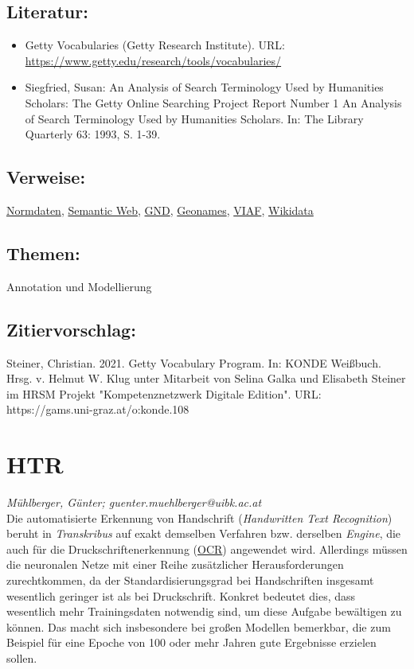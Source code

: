 \documentclass{article}
\begin{document}
        \subsection*{Literatur:}\begin{itemize}\item Getty Vocabularies (Getty Research Institute). URL: \url{https://www.getty.edu/research/tools/vocabularies/}\item Siegfried, Susan: An Analysis of Search Terminology Used by Humanities Scholars: The Getty Online Searching Project Report Number 1 An Analysis of Search Terminology Used by Humanities Scholars. In: The Library Quarterly 63: 1993, S. 1-39.\end{itemize}\subsection*{Verweise:}\href{https://gams.uni-graz.at/o:konde.147}{Normdaten}, \href{https://gams.uni-graz.at/o:konde.167}{Semantic Web}, \href{https://gams.uni-graz.at/o:konde.109}{GND}, \href{https://gams.uni-graz.at/o:konde.107}{Geonames}, \href{https://gams.uni-graz.at/o:konde.111}{VIAF}, \href{https://gams.uni-graz.at/o:konde.112}{Wikidata}\subsection*{Themen:}Annotation und Modellierung\subsection*{Zitiervorschlag:}Steiner, Christian. 2021. Getty Vocabulary Program. In: KONDE Weißbuch. Hrsg. v. Helmut W. Klug unter Mitarbeit von Selina Galka und Elisabeth Steiner im HRSM Projekt "Kompetenznetzwerk Digitale Edition". URL: https://gams.uni-graz.at/o:konde.108\newpage\section*{HTR} \emph{Mühlberger, Günter; guenter.muehlberger@uibk.ac.at }\\
        
    Die automatisierte Erkennung von Handschrift (\emph{Handwritten Text
                     Recognition}) beruht in \emph{Transkribus} auf exakt
                  demselben Verfahren bzw. derselben \emph{Engine}, die auch für die
                  Druckschriftenerkennung (\href{http://gams.uni-graz.at/o:konde.149}{OCR})
                  angewendet wird. Allerdings müssen die neuronalen Netze mit einer Reihe
                  zusätzlicher Herausforderungen zurechtkommen, da der Standardisierungsgrad bei
                  Handschriften insgesamt wesentlich geringer ist als bei Druckschrift. Konkret
                  bedeutet dies, dass wesentlich mehr Trainingsdaten notwendig sind, um diese
                  Aufgabe bewältigen zu können. Das macht sich insbesondere bei großen Modellen
                  bemerkbar, die zum Beispiel für eine Epoche von 100 oder mehr Jahren gute
                  Ergebnisse erzielen sollen. \\
            
\end{document}
